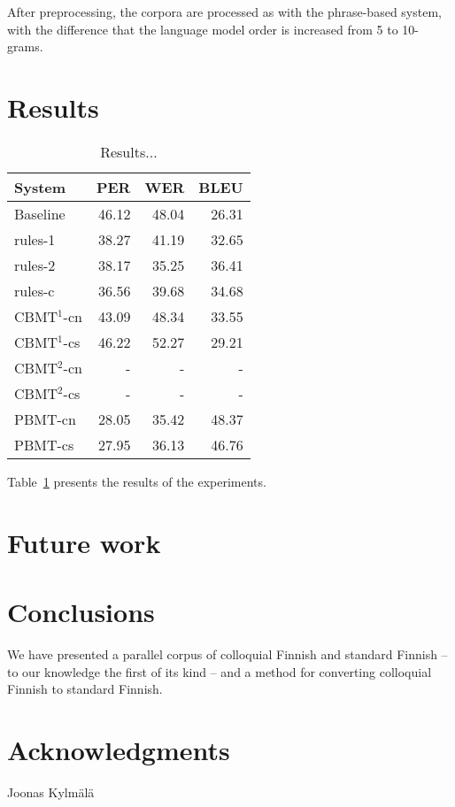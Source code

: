 \documentclass[11pt]{article}
\begin{document}
After preprocessing, the corpora are processed as with the phrase-based system, with the difference that the language model order is increased from 5 to 10-grams.

\section{Results}

\begin{table}
  \centering
  \begin{tabular}{|l|r|r|r|}
     \hline
    \textbf{System} & \textbf{PER} & \textbf{WER} & \textbf{BLEU} \\
     \hline
     Baseline & 46.12 & 48.04 & 26.31 \\
     \hline
     rules-1 & 38.27 & 41.19 & 32.65 \\
     rules-2 & 38.17 & 35.25 & 36.41 \\
     rules-c & 36.56 & 39.68 & 34.68 \\
     \hline
     CBMT$^1$-cn & 43.09 & 48.34 & 33.55 \\
     CBMT$^1$-cs & 46.22 & 52.27 & 29.21 \\
     CBMT$^2$-cn & - & - & - \\
     CBMT$^2$-cs & - & - & - \\
     PBMT-cn & 28.05 & 35.42 & 48.37 \\
     PBMT-cs & 27.95 & 36.13 & 46.76 \\
     \hline
  \end{tabular}
  \caption{Results...}
  \label{table:results}
\end{table}

Table~\ref{table:results} presents the results of the experiments.

\section{Future work}

% 

\section{Conclusions}

We have presented a parallel corpus of colloquial Finnish and standard Finnish --
to our knowledge the first of its kind -- and a method for converting colloquial
Finnish to standard Finnish.


\section*{Acknowledgments}

Joonas Kylm\"{a}l\"{a}



\end{document}
